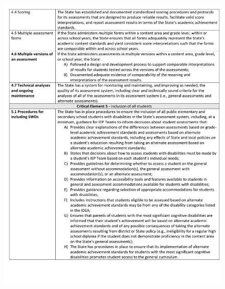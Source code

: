 \documentclass[]{article}
\begin{document}
\begin{figure}
\centering
\includegraphics{Figures/peer_rev/PeerReview4.pdf}
\caption{}
\end{figure}

\newpage
\end{document}
